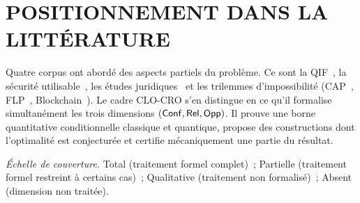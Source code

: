 \section{POSITIONNEMENT DANS LA LITT\'ERATURE}
\label{sec:cg_positionnement}
\begin{sloppypar}

Quatre corpus ont abord\'e des aspects partiels du probl\`eme. Ce sont la
QIF~\cite{Smith09}, la s\'ecurit\'e utilisable~\cite{Bonneau12}, les \'etudes
juridiques~\cite{Kerr04} et les trilemmes d'impossibilit\'e
(CAP~\cite{Brewer00,GilbertLynch02}, FLP~\cite{FLP85},
Blockchain~\cite{Nakamoto08,Buterin17}). Le cadre CLO-CRO s'en distingue
en ce qu'il formalise simultan\'ement les trois dimensions
$(\mathsf{Conf}, \mathsf{Rel}, \mathsf{Opp})$. Il prouve une borne quantitative conditionnelle
classique et quantique, propose des constructions dont l'optimalit\'e est
conjectur\'ee et certifie m\'ecaniquement une partie du r\'esultat.

\begin{table}[htbp]
\centering
\caption{Positionnement par rapport aux travaux existants.}
\label{tab:positionnement_travaux}

\vspace{0.4em}
\footnotesize
\textit{\'Echelle de couverture.} Total (traitement formel complet)~;
Partielle (traitement formel restreint \`a certains cas)~; Qualitative
(traitement non formalis\'e)~; Absent (dimension non trait\'ee).
\end{table}

\end{sloppypar}

